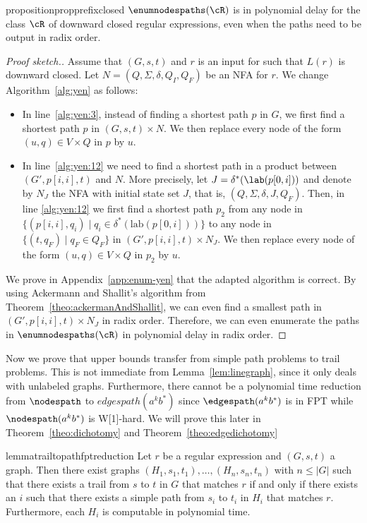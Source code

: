 \documentclass[a4paper,english]{lipics-v2016}
\theoremstyle{plain}
\begin{document}
\begin{restatable}{proposition}{propprefixclosed} \label{prop:prefixclosed}
 $\enumnodespaths(\cR)$ is in polynomial delay for the class $\cR$ of
 downward closed regular expressions, even when the paths need to be
 output in radix order.
\end{restatable}
\begin{proof}[Proof sketch.]
  Assume that $(G,s,t)$ and $r$ is an input for \enumnodespaths such that
  $L(r)$ is downward closed. Let $N = (Q,\Sigma,\delta, Q_I, Q_F)$ be
  an NFA for $r$.  We change Algorithm~\ref{alg:yen} as follows:
  \begin{itemize}
  \item In line~\ref{alg:yen:3}, instead of finding a shortest path
    $p$ in $G$, we first find a shortest path $p$ in $(G,s,t) \times
    N$. We then replace every node of the form $(u,q) \in V\times Q$
    in $p$ by $u$.
  \item In line~\ref{alg:yen:12} we need to find a shortest path in a
    product between $(G',p[i,i],t)$ and $N$. More precisely, let $J =
    \delta^*(\lab(p[0,i]))$ and denote by $N_J$ the NFA with initial
    state set $J$, that is, $(Q,\Sigma,\delta,J,Q_F)$. Then, in line
    \ref{alg:yen:12} we first find a shortest path $p_2$ from any node
    in $\{(p[i,i],q_i) \mid q_i \in \delta^*(\text{lab}(p[0,i]))\}$ to any
    node in $\{(t,q_F) \mid q_F \in Q_F\}$ in $(G',p[i,i],t) \times
    N_J$. We then replace every node of the form $(u,q) \in V\times Q$
    in $p_2$ by $u$.
  \end{itemize}
  We prove in Appendix~\ref{app:enum-yen} that the adapted algorithm is correct.
    By using Ackermann and Shallit's algorithm \cite{Ackerman-TCS09} from
  Theorem~\ref{theo:ackermanAndShallit}, we can even find a smallest
  path in $(G',p[i,i],t) \times N_J$ in radix order. Therefore, we can
  even enumerate the paths in $\enumnodespaths(\cR)$ in polynomial delay
  in radix order.
\end{proof}




Now we prove that upper bounds transfer from simple path problems to
trail problems. This is not immediate from Lemma~\ref{lem:linegraph},
since it only deals with unlabeled graphs.
Furthermore, there cannot be a polynomial time reduction from $\nodespath$ to $edgespath(a^kb^*)$ since $\edgespath(a^kb^*)$ is in FPT while $\nodespath(a^kb^*)$ is W[1]-hard. We will prove this later in Theorem~\ref{theo:dichotomy} and Theorem~\ref{theo:edgedichotomy}
\begin{restatable}{lemma}{trailtopathfptreduction}\label{lemma:edgeToNodes}
  Let $r$ be a regular expression and $(G,s,t)$ a graph. Then there
  exist graphs $(H_1,s_1,t_1),\ldots,(H_n,s_n,t_n)$ with $n \leq |G|$ such that there
  exists a trail from $s$ to $t$ in $G$ that matches $r$ if and only
  if there exists an $i$ such that there exists a simple path from
  $s_i$ to $t_i$ in $H_i$ that matches $r$.  Furthermore, each $H_i$
  is computable in polynomial time.
		\end{restatable}
\end{document}
